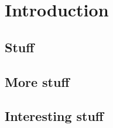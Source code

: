 \chapter{Introduction}

\section{Stuff}
\lipsum[3-4]

\section{More stuff}
\lipsum[3-4]

\section{Interesting stuff}
\lipsum[3-4]